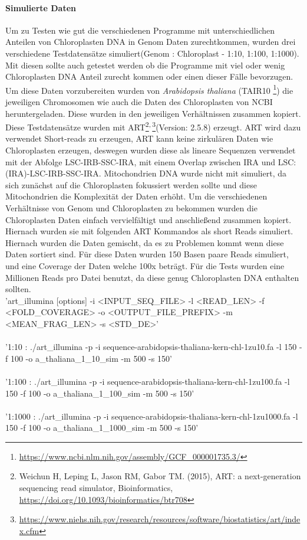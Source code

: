 \documentclass{scrartcl}
\begin{document}
\paragraph{Simulierte Daten}
\label{sec-3-1-1-1}
Um zu Testen wie gut die verschiedenen Programme mit unterschiedlichen Anteilen von Chloroplasten DNA in
Genom Daten zurechtkommen, wurden drei verschiedene Testdatensätze simuliert(Genom : Chloroplast - 1:10, 1:100, 1:1000). 
Mit diesen sollte auch getestet werden ob die Programme mit viel oder wenig Chloroplasten DNA Anteil zurecht kommen oder einen dieser Fälle 
bevorzugen. Um diese Daten vorzubereiten wurden von \emph{Arabidopsis thaliana} (TAIR10 \footnote{\url{https://www.ncbi.nlm.nih.gov/assembly/GCF_000001735.3/}}) die jeweiligen Chromosomen wie auch die Daten
des Chloroplasten von NCBI heruntergeladen. Diese wurden in den jeweiligen Verhältnissen zusammen kopiert.
Diese Testdatensätze wurden mit ART\footnote{Weichun H, Leping L, Jason RM, Gabor TM. (2015), ART: a next-generation sequencing read simulator, Bioinformatics, \url{https://doi.org/10.1093/bioinformatics/btr708}}\textsuperscript{,}\,\footnote{\url{https://www.niehs.nih.gov/research/resources/software/biostatistics/art/index.cfm}}(Version: 2.5.8) erzeugt. ART wird dazu verwendet Short-reads zu erzeugen, ART kann keine zirkulären Daten wie Chloroplasten 
erzeugen, deswegen wurden diese als lineare Sequenzen verwendet mit der Abfolge LSC-IRB-SSC-IRA, mit einem Overlap zwischen IRA und LSC: (IRA)-LSC-IRB-SSC-IRA. 
Mitochondrien DNA wurde nicht mit simuliert, da sich zunächst auf die Chloroplasten fokussiert werden sollte und diese Mitochondrien die Komplexität der Daten
erhöht.
Um die verschiedenen Verhältnisse von Genom und Chloroplasten zu bekommen wurden die Chloroplasten Daten einfach
vervielfältigt und anschließend zusammen kopiert. Hiernach wurden sie mit folgenden ART Kommandos als short Reads simuliert.
Hiernach wurden die Daten gemischt, da es zu Problemen kommt wenn diese Daten sortiert sind. Für diese Daten wurden 150 Basen paare Reads simuliert, 
und eine Coverage der Daten welche 100x beträgt. 
Für die Tests wurden eine Millionen Reads pro Datei benutzt, da diese genug Chloroplasten DNA enthalten sollten.
\\
{\small 'art\_illumina [options] -i <INPUT\_SEQ\_FILE> -l <READ\_LEN> -f <FOLD\_COVERAGE>
-o <OUTPUT\_FILE\_PREFIX> -m <MEAN\_FRAG\_LEN> -s <STD\_DE>'}
\\
\\
'1:10 : ./art\_illumina -p -i sequence-arabidopsis-thaliana-kern-chl-1zu10.fa -l 150 -f 100 
-o a\_thaliana\_1\_10\_sim -m 500 -s 150'
\\
\\
'1:100 :  ./art\_illumina -p -i sequence-arabidopsis-thaliana-kern-chl-1zu100.fa -l 150 -f 100 
-o a\_thaliana\_1\_100\_sim -m 500 -s 150'
\\
\\
'1:1000 :  ./art\_illumina -p -i sequence-arabidopsis-thaliana-kern-chl-1zu1000.fa -l 150 -f 100 
-o a\_thaliana\_1\_1000\_sim -m 500 -s 150'
\end{document}

